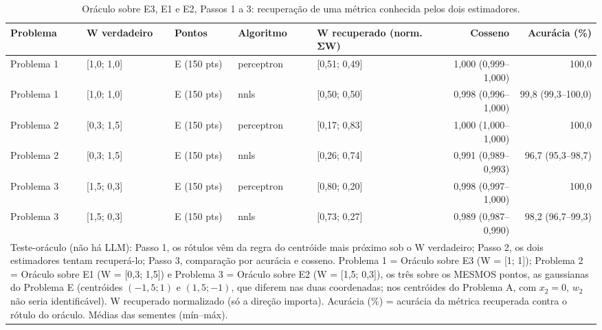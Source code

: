 \begin{table}[htbp]
\centering
\small
\caption{Oráculo sobre E3, E1 e E2, Passos 1 a 3: recuperação de uma métrica conhecida pelos dois estimadores.}
\label{tab:bloco1_oraculo_passos_1_a_3}
\begin{tabular}{lllllrr}
\toprule
Problema & W verdadeiro & Pontos & Algoritmo & W recuperado (norm. ΣW) & Cosseno & Acurácia (\%) \\
\midrule
Problema 1 & [1,0; 1,0] & E (150 pts) & perceptron & [0,51; 0,49] & 1,000 (0,999–1,000) & 100,0 \\
Problema 1 & [1,0; 1,0] & E (150 pts) & nnls & [0,50; 0,50] & 0,998 (0,996–1,000) & 99,8 (99,3–100,0) \\
\midrule
Problema 2 & [0,3; 1,5] & E (150 pts) & perceptron & [0,17; 0,83] & 1,000 (1,000–1,000) & 100,0 \\
Problema 2 & [0,3; 1,5] & E (150 pts) & nnls & [0,26; 0,74] & 0,991 (0,989–0,993) & 96,7 (95,3–98,7) \\
\midrule
Problema 3 & [1,5; 0,3] & E (150 pts) & perceptron & [0,80; 0,20] & 0,998 (0,997–1,000) & 100,0 \\
Problema 3 & [1,5; 0,3] & E (150 pts) & nnls & [0,73; 0,27] & 0,989 (0,987–0,990) & 98,2 (96,7–99,3) \\
\bottomrule
\multicolumn{7}{p{0.95\linewidth}}{\footnotesize Teste-oráculo (não há LLM): Passo 1, os rótulos vêm da regra do centróide mais próximo sob o W verdadeiro; Passo 2, os dois estimadores tentam recuperá-lo; Passo 3, comparação por acurácia e cosseno. Problema 1 = Oráculo sobre E3 (W = [1; 1]); Problema 2 = Oráculo sobre E1 (W = [0,3; 1,5]) e Problema 3 = Oráculo sobre E2 (W = [1,5; 0,3]), os três sobre os MESMOS pontos, as gaussianas do Problema E (centróides $(-1{,}5; 1)$ e $(1{,}5; -1)$, que diferem nas duas coordenadas; nos centróides do Problema A, com $x_2 = 0$, $w_2$ não seria identificável). W recuperado normalizado (só a direção importa). Acurácia (\%) = acurácia da métrica recuperada contra o rótulo do oráculo. Médias das sementes (mín–máx).} \\
\end{tabular}
\end{table}
